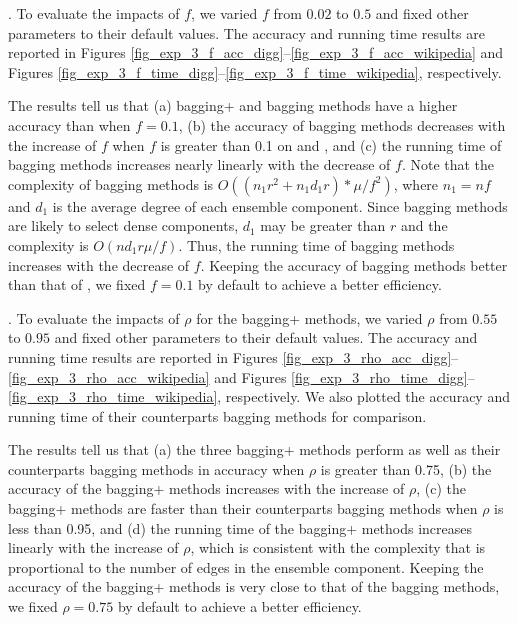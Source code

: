 . To evaluate the impacts of $f$, we
varied $f$ from $0.02$ to $0.5$ and fixed other parameters to their
default values. The accuracy and running time results are reported in
Figures \ref{fig_exp_3_f_acc_digg}--\ref{fig_exp_3_f_acc_wikipedia} and 
Figures \ref{fig_exp_3_f_time_digg}--\ref{fig_exp_3_f_time_wikipedia}, respectively.



The results tell us that (a) bagging+ and bagging methods have a higher accuracy
than \NMF when $f = 0.1$, (b) the accuracy of bagging methods decreases
with the increase of $f$ when $f$ is greater than 0.1 on \Digg and \Wikipedia,
and (c) the running time of bagging methods increases
nearly linearly with the decrease of $f$. Note that the complexity of bagging methods is
$O((n_{1}r^2 + n_{1}d_{1}r)*\mu /f^2)$, where $n_1 = nf$ and $d_1$ is the average degree of
each ensemble component. Since bagging methods are likely to select dense components, $d_1$
may be greater than $r$ and the complexity is $O(nd_1r\mu /f)$. Thus, the running time
of bagging methods increases with the decrease of $f$. Keeping the accuracy of bagging
methods better than that of \NMF, we fixed $f = 0.1$ by default to achieve a better efficiency.




. To evaluate the impacts of $\rho$ for
the bagging+ methods, we varied $\rho$ from $0.55$ to $0.95$ and
fixed other parameters to their default values. The accuracy and
running time results are reported in
Figures \ref{fig_exp_3_rho_acc_digg}--\ref{fig_exp_3_rho_acc_wikipedia} and 
Figures \ref{fig_exp_3_rho_time_digg}--\ref{fig_exp_3_rho_time_wikipedia}, respectively.
We also plotted the accuracy and running time of their counterparts
bagging methods for comparison.

The results tell us that (a) the three bagging+ methods perform
as well as their counterparts bagging methods in accuracy when
$\rho$ is greater than 0.75, (b) the accuracy of the bagging+ methods
increases with the increase of $\rho$, (c) the bagging+ methods are faster
than their counterparts bagging methods when $\rho$ is less than 0.95,
and (d) the running time of the bagging+ methods increases linearly
with the increase of $\rho$, which is consistent with
the complexity that is proportional to the number of edges in the
ensemble component. Keeping the accuracy of the bagging+ methods is very close to
that of the bagging methods, we fixed $\rho = 0.75$ by default to achieve a better efficiency.



